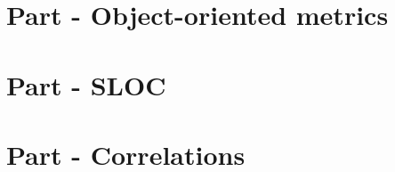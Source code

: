 \documentclass[12pt]{article}
\begin{document}
\section{Part - Object-oriented metrics}

\section{Part - SLOC}

\section{{Part - Correlations}}

{}

\end{document}
